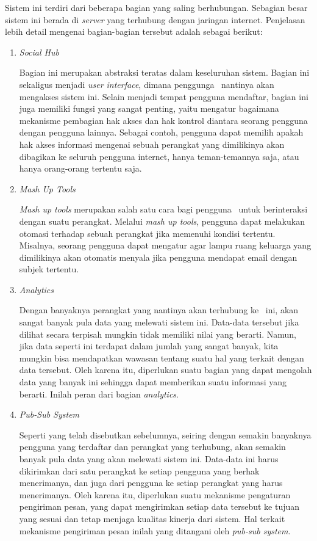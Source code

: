 Sistem ini terdiri dari beberapa bagian yang saling berhubungan. Sebagian besar sistem ini berada di \textit{server} yang terhubung dengan jaringan internet. Penjelasan lebih detail mengenai bagian-bagian tersebut adalah sebagai berikut:
\begin{enumerate}
	\item \textit{Social Hub}
	
	Bagian ini merupakan abstraksi teratas dalam keseluruhan sistem. Bagian ini sekaligus menjadi \textit{user interface}, dimana penggunga \plat~nantinya akan mengakses sistem ini. Selain menjadi tempat pengguna mendaftar, bagian ini juga memiliki fungsi yang sangat penting, yaitu mengatur bagaimana mekanisme pembagian hak akses dan hak kontrol diantara seorang pengguna dengan pengguna lainnya. Sebagai contoh, pengguna dapat memilih apakah hak akses informasi mengenai sebuah perangkat yang dimilikinya akan dibagikan ke seluruh pengguna internet, hanya teman-temannya saja, atau hanya orang-orang tertentu saja.
	
	\item \textit{Mash Up Tools}
	
	\textit{Mash up tools} merupakan salah satu cara bagi pengguna \plat~untuk berinteraksi dengan suatu perangkat. Melalui \textit{mash up tools}, pengguna dapat melakukan otomasi terhadap sebuah perangkat jika memenuhi kondisi tertentu. Misalnya, seorang pengguna dapat mengatur agar lampu ruang keluarga yang dimilikinya akan otomatis menyala jika pengguna mendapat email dengan subjek tertentu.
	
	\item \textit{Analytics}
	
	Dengan banyaknya perangkat yang nantinya akan terhubung ke \plat~ini, akan sangat banyak pula data yang melewati sistem ini. Data-data tersebut jika dilihat secara terpisah mungkin tidak memiliki nilai yang berarti. Namun, jika data seperti ini terdapat dalam jumlah yang sangat banyak, kita mungkin bisa mendapatkan wawasan tentang suatu hal yang terkait dengan data tersebut. Oleh karena itu, diperlukan suatu bagian yang dapat mengolah data yang banyak ini sehingga dapat memberikan suatu informasi yang berarti. Inilah peran dari bagian \textit{analytics}.
	
	\item \textit{Pub-Sub System}
	
	Seperti yang telah disebutkan sebelumnya, seiring dengan semakin banyaknya pengguna yang terdaftar dan perangkat yang terhubung, akan semakin banyak pula data yang akan melewati sistem ini. Data-data ini harus dikirimkan dari satu perangkat ke setiap pengguna yang berhak menerimanya, dan juga dari pengguna ke setiap perangkat yang harus menerimanya. Oleh karena itu, diperlukan suatu mekanisme pengaturan pengiriman pesan, yang dapat mengirimkan setiap data tersebut ke tujuan yang sesuai dan tetap menjaga kualitas kinerja dari sistem. Hal terkait mekanisme pengiriman pesan inilah yang ditangani oleh \textit{pub-sub system}.
	

\end{enumerate}
